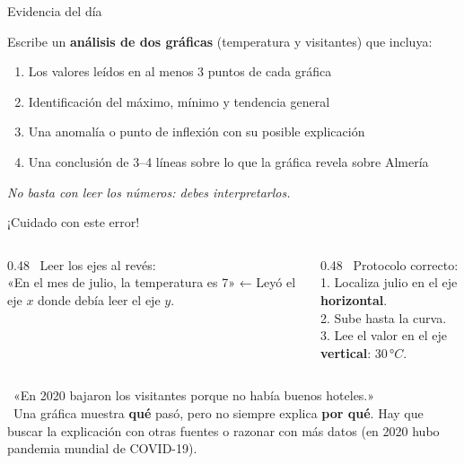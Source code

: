 \documentclass[aspectratio=169, 10pt, spanish]{beamer}
\begin{document}
\begin{frame}{Evidencia del día}
  \begin{evidenciabox}
    Escribe un \textbf{análisis de dos gráficas} (temperatura y
    visitantes) que incluya:
    \begin{enumerate}
      \item Los valores leídos en al menos 3 puntos de cada gráfica
      \item Identificación del máximo, mínimo y tendencia general
      \item Una anomalía o punto de inflexión con su posible explicación
      \item Una conclusión de 3--4 líneas sobre lo que la gráfica revela
            sobre Almería
    \end{enumerate}
    \vspace{4pt}
    \textit{No basta con leer los números: debes interpretarlos.}
  \end{evidenciabox}
\end{frame}

\begin{frame}{¡Cuidado con este error!}
  \begin{errorbox}
    \begin{columns}[c]
      \begin{column}{0.48\textwidth}
        \incorrecto\ Leer los ejes al revés:\\[4pt]
        «En el mes de julio, la temperatura
        es 7» ← Leyó el eje $x$ donde debía
        leer el eje $y$.
      \end{column}
      \begin{column}{0.48\textwidth}
        \correcto\ Protocolo correcto:\\[4pt]
        1. Localiza julio en el eje \textbf{horizontal}.\\
        2. Sube hasta la curva.\\
        3. Lee el valor en el eje \textbf{vertical}: $30\,°C$.
      \end{column}
    \end{columns}
  \end{errorbox}
  \vspace{6pt}
  \begin{errorbox}
    \incorrecto\ «En 2020 bajaron los visitantes porque
    no había buenos hoteles.»\\[4pt]
    \correcto\ Una gráfica muestra \textbf{qué} pasó,
    pero no siempre explica \textbf{por qué}.
    Hay que buscar la explicación con otras fuentes o razonar
    con más datos (en 2020 hubo pandemia mundial de COVID-19).
  \end{errorbox}
\end{frame}
\end{document}
